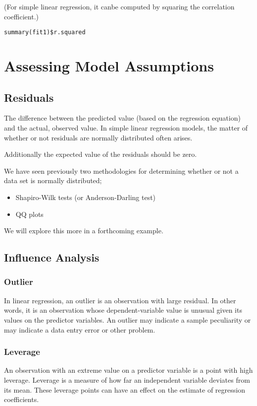 \documentclass[a4paper,12pt]{article}
\begin{document}
(For simple linear regression, it canbe computed by squaring the correlation coefficient.)

\begin{framed}
\begin{verbatim}
summary(fit1)$r.squared
\end{verbatim}
\end{framed}
\newpage
\section{Assessing Model Assumptions}
\subsection{Residuals}  The difference between the predicted value (based on the regression equation) and the actual, observed value. In simple linear regression models, the matter of whether or not residuals are normally distributed often arises.

Additionally the expected value of the residuals should be zero.

We have seen previously two methodologies for determining whether or not a data set is normally distributed;

\begin{itemize} \item 	Shapiro-Wilk tests (or Anderson-Darling test)
\item 	QQ plots
\end{itemize}

We will explore this more in a forthcoming example.
\subsection{Influence Analysis}


\subsubsection{Outlier} In linear regression, an outlier is an observation with large residual.  In other words, it is an observation whose dependent-variable value is unusual given its values on the predictor variables.  An outlier may indicate a sample peculiarity or may indicate a data entry error or other problem.
\subsubsection{Leverage}  An observation with an extreme value on a predictor variable is a point with high leverage.  Leverage is a measure of how far an independent variable deviates from its mean.  These leverage points can have an effect on the estimate of regression coefficients.
\end{document}
